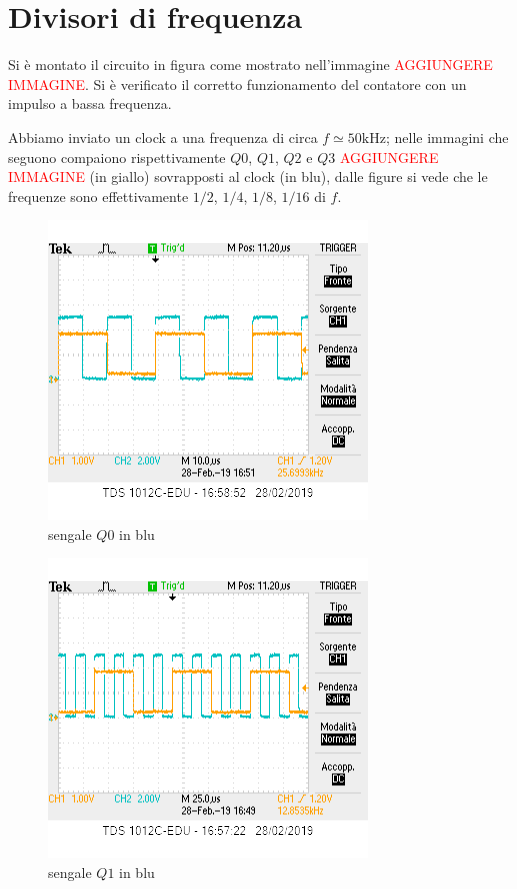 \documentclass[10pt,a4paper]{article}
\begin{document}
\section{ Divisori di frequenza }
Si è montato il circuito in figura come mostrato nell'immagine \textcolor{red}{AGGIUNGERE IMMAGINE}.
Si è verificato il corretto funzionamento del contatore con un impulso a bassa frequenza.

Abbiamo inviato un clock a una frequenza di circa $f\simeq 50 \si{\kilo \hertz}$; nelle immagini che seguono compaiono  rispettivamente $Q0$, $Q1$, $Q2$ e $Q3$ \textcolor{red}{AGGIUNGERE IMMAGINE} (in giallo) sovrapposti al clock (in blu), dalle figure si vede che le frequenze sono effettivamente $1/2$, $1/4$, $1/8$, $1/16$ di $f$.
\begin{figure}[h]
			\centering
			\includegraphics[scale=0.85]{1mezzo}
			\caption{sengale $Q0$ in blu}
			\label{fig:plh}
\end{figure}
\begin{figure}[h]
			\centering
			\includegraphics[scale=0.85]{1quarto}
			\caption{sengale $Q1$ in blu}
			\label{fig:plh}
\end{figure}
\end{document}
